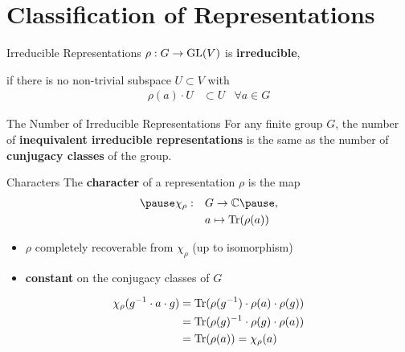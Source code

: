 
\section{Classification of Representations}

\begin{frame}{Irreducible Representations}
    \large
    $\rho: G \to \operatorname{GL}(V)$ is \textbf{irreducible},
    
    \pause
    if there is no non-trivial subspace $U \subset V$ with
    \pause
    \begin{align*}
        \rho(a) \cdot U & \subset U & \forall a \in G
    \end{align*}

    \normalsize
    {\hspace*{\fill} \cite{hein2013}}

\end{frame}

\begin{frame}{The Number of Irreducible Representations}
    For any finite group $G$, the number of \textbf{inequivalent irreducible representations} is the same as the number of \textbf{cunjugacy classes} of the group.

    {\hspace*{\fill} \cite{fulton2013}}
    
\end{frame}

\begin{frame}{Characters}
    \large
    The \textbf{character} of a representation $\rho$ is the map
    \Large
    \begin{align*}
        \pause
        \chi_\rho: \quad & G \to \C \pause , \\
        & a \mapsto \Tr(\rho(a))
    \end{align*}
    
    \pause
    \large
    \begin{itemize}
        \item $\rho$ completely recoverable from $\chi_\rho$ (up to isomorphism) \pause
        \item \textbf{constant} on the conjugacy classes of $G$
    \end{itemize}
    \begin{align*}
        \chi_\rho(g^{-1} \cdot a \cdot g)
        & = \operatorname{Tr}(\rho(g^{-1}) \cdot \rho(a) \cdot \rho(g)) \\
        & = \operatorname{Tr}(\rho(g)^{-1} \cdot \rho(g) \cdot \rho(a)) \\
        & = \operatorname{Tr}(\rho(a)) = \chi_\rho(a)
    \end{align*}

    \normalsize
    {\hspace*{\fill} \cite{fulton2013}}
    
\end{frame}

